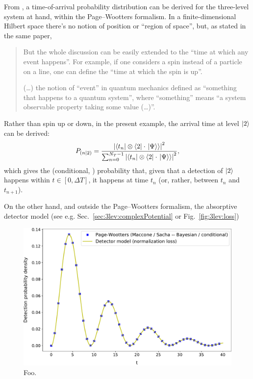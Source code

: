 From \cite{Maccone:QMOT}, a time-of-arrival probability distribution can be derived
for the three-level system at hand, within the Page--Wootters formalism.
In a finite-dimensional
Hilbert space there's no notion of position or ``region of space'', but, as stated in the
same paper,
\begin{quote}
  But the whole discussion can be easily extended to the “time at which any
  event happens”. For example, if one considers a spin instead of a particle on a line, one can define the “time at
  which the spin is up”.
  
  (\dots) the notion of ``event'' in quantum mechanics defined as ``something that happens to a
  quantum system'', where ``something'' means ``a system
  observable property taking some value (\dots)''.
\end{quote}
Rather than spin up or down, in the present example, the arrival time at level $\ket{2}$
can be derived:
\begin{equation}\label{eq:3lev:bayesPW}
  P_{(n|2)} = \frac{
    \abs{\bra{t_n} \otimes \bra{2} \cdot \left.\left| \Psi \right\rangle\right\rangle}^2
  }{
    \sum_{n=0}^{N_{T} - 1} \abs{\bra{t_n} \otimes \bra{2} \cdot \left.\left| \Psi \right\rangle\right\rangle}^2
  }
  \text{,}
\end{equation}
which gives the (conditional, ) probability that, given that a detection of $\ket{2}$
happens
within $t \in [0, \Delta T]$, it happens at time $t_n$ (or, rather, between $t_n$ and $t_{n+1}$).

On the other hand, and outside the Page--Wootters formalism,
the absorptive detector model
(see e.g. Sec.~\ref{sec:3lev:complexPotential} or Fig.~\ref{fig:3lev:loss})


\begin{figure}[]
  \centering
  \includegraphics[width=\textwidth]{img/3ldetect/conditionalProbFit.pdf}
  \caption{Foo.}
\end{figure}